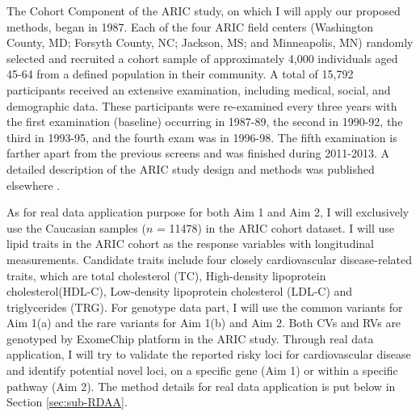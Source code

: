 \documentclass[12pt]{article}
\begin{document}
The Cohort Component of the ARIC study, on which I will apply our proposed methods, began in 1987. Each of the four ARIC field centers (Washington County, MD; Forsyth County, NC; Jackson, MS; and Minneapolis, MN) randomly selected and recruited a cohort sample of approximately 4,000 individuals aged 45-64 from a defined population in their community. A total of 15,792 participants received an extensive examination, including medical, social, and demographic data. These participants were re-examined every three years with the first examination (baseline) occurring in 1987-89, the second in 1990-92, the third in 1993-95, and the fourth exam was in 1996-98. The fifth examination is farther apart from the previous screens and was finished during 2011-2013. A detailed description of the ARIC study design and methods was published elsewhere \cite{Investigators1989}.

As for real data application purpose for both Aim 1 and Aim 2, I will exclusively use the Caucasian samples ($n$ = 11478) in the ARIC cohort dataset. I will use lipid traits in the ARIC cohort as the response variables with longitudinal measurements. Candidate traits include four closely cardiovascular disease-related traits, which are total cholesterol (TC), High-density lipoprotein cholesterol(HDL-C), Low-density lipoprotein cholesterol (LDL-C) and triglycerides (TRG). For genotype data part, I will use the common variants for Aim 1(a) and the rare variants for Aim 1(b) and Aim 2. Both CVs and RVs are genotyped by ExomeChip platform \cite{Grove2013} in the ARIC study. Through real data application, I will try to validate the reported risky loci for cardiovascular disease and identify potential novel loci, on a specific gene (Aim 1) or within a specific pathway (Aim 2). The method details for real data application is put below in Section \ref{sec:sub-RDAA}.
\end{document}
